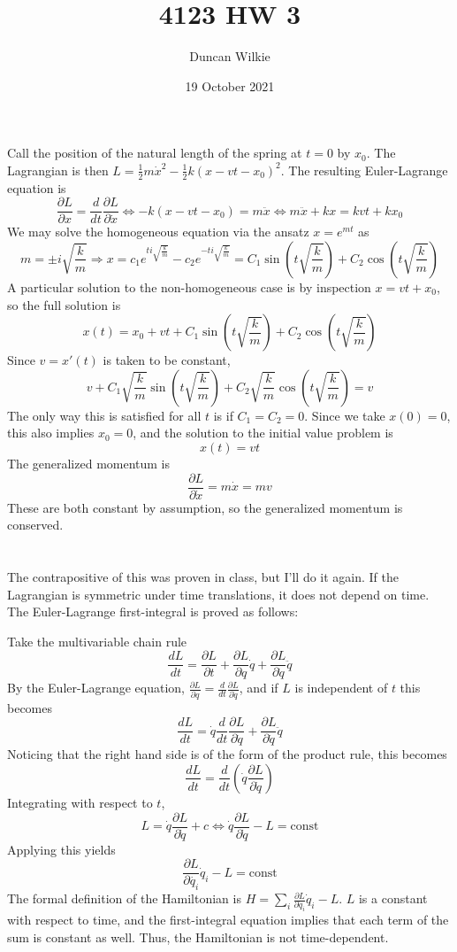 \documentclass{article}
\title{4123 HW 3}
\author{Duncan Wilkie}
\date{19 October 2021}
\begin{document}
\maketitle

\section{}
Call the position of the natural length of the spring at $t=0$ by $x_0$.
The Lagrangian is then $L=\frac{1}{2}m\dot{x}^2-\frac{1}{2}k(x-vt-x_0)^2$. The resulting Euler-Lagrange equation is
\[\frac{\partial L}{\partial x}=\frac{d}{dt}\frac{\partial L}{\partial \dot{x}}\Leftrightarrow -k(x-vt-x_0)=m\ddot{x} \Leftrightarrow m\ddot{x}+kx =kvt+kx_0\]
We may solve the homogeneous equation via the ansatz $x=e^{mt}$ as \[m=\pm i\sqrt{\frac{k}{m}}\Rightarrow x=c_1e^{ti\sqrt{\frac{k}{m}}}-c_2e^{-ti\sqrt{\frac{k}{m}}}=C_1\sin\left(t\sqrt{\frac{k}{m}}\right)+C_2\cos\left(t\sqrt{\frac{k}{m}}\right)\]
A particular solution to the non-homogeneous case is by inspection $x=vt+x_0$, so the full solution is
\[x(t)=x_0+vt+C_1\sin\left(t\sqrt{\frac{k}{m}}\right)+C_2\cos\left( t\sqrt{\frac{k}{m}} \right)\]
Since $v=x'(t)$ is taken to be constant,
\[v+C_1\sqrt{\frac{k}{m}}\sin\left( t\sqrt{\frac{k}{m}} \right)+C_2\sqrt{\frac{k}{m}}\cos\left( t\sqrt{\frac{k}{m}} \right)=v\]
The only way this is satisfied for all $t$ is if $C_1=C_2=0$. Since we take $x(0)=0$, this also implies $x_0=0$, and the solution to the initial value problem is
\[x(t)=vt\]
The generalized momentum is\[\frac{\partial L}{\partial \dot{x}}=m\dot{x}=mv\]
These are both constant by assumption, so the generalized momentum is conserved.

\section{}
The contrapositive of this was proven in class, but I'll do it again.
If the Lagrangian is symmetric under time translations, it does not depend on time.
The Euler-Lagrange first-integral is proved as follows:

Take the multivariable chain rule
\[\frac{dL}{dt}=\frac{\partial L}{\partial t}+\frac{\partial L}{\partial q}\dot{q}+\frac{\partial L}{\partial\dot{q}}\ddot{q}\]
By the Euler-Lagrange equation, $\frac{\partial L}{\partial q}=\frac{d}{dt}\frac{\partial L}{\partial\dot{q}}$, and if $L$ is independent of $t$ this becomes
\[\frac{dL}{dt}=\dot{q}\frac{d}{dt}\frac{\partial L}{\partial \dot{q}}+\frac{\partial L}{\partial \dot{q}}\ddot{q}\]
Noticing that the right hand side is of the form of the product rule, this becomes
\[\frac{dL}{dt}=\frac{d}{dt}\left(  \dot{q}\frac{\partial L}{\partial\dot{q}} \right)\]
Integrating with respect to $t$,
\[L=\dot{q}\frac{\partial L}{\partial\dot{q}}+c\Leftrightarrow \dot{q}\frac{\partial L}{\partial\dot{q}}-L=\textrm{const}\]
Applying this yields
\[\frac{\partial L}{\partial \dot{q_i}}\dot{q}_i-L = \textrm{const}\]
The formal definition of the Hamiltonian is $H=\sum_i\frac{\partial L}{\partial\dot{q}_i}\dot{q}_i- L $. $L$ is a constant with respect to time, and the first-integral equation implies that each term of the sum is constant as well. Thus, the Hamiltonian is not time-dependent.
\end{document}
